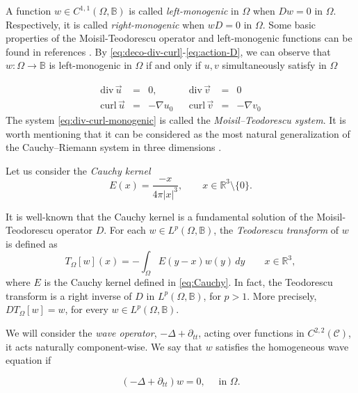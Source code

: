 \documentclass[12pt]{article}
\def\div{\mbox{div}\,}
\def\curl{\mbox{curl}\,}
\def\B{\mathbb{B}}
\begin{document}
A function $w\in C^{1,1}(\Omega,\B)$ is called \textit{left-monogenic} in $\Omega$ when $Dw=0$ in $\Omega$. Respectively, it is called \textit{right-monogenic} when $wD=0$ in $\Omega$. Some basic properties of the Moisil-Teodorescu operator and left-monogenic functions can be found in references \cite{brackx1982, kravchenko2003applied, GuHaSpr2008}. By \eqref{eq:deco-div-curl}-\eqref{eq:action-D}, we can observe that $w:\Omega\to\B$ is left-monogenic in $\Omega$ if and only if $u, v$ simultaneously satisfy in $\Omega$

\begin{equation}\label{eq:div-curl-monogenic}
    \begin{array}{rclcrcl}
        \div \vec u&=&0,& &\div\vec v&=&0\\
        \curl\vec u&=&-\nabla u_0 & & \curl\vec v&=&-\nabla v_0
    \end{array}
\end{equation}
The system \eqref{eq:div-curl-monogenic} is called the \textit{Moisil--Teodorescu system}. It is worth mentioning that it can be considered as the most natural generalization of the Cauchy--Riemann system in three dimensions \cite{kravchenko2003applied}.

Let us consider the \textit{Cauchy kernel}
\begin{equation}\label{eq:Cauchy}
    E(x)=\frac{-x}{4\pi|x|^3},\qquad x\in\mathbb{R}^3\setminus\{0\}.
\end{equation}

It is well-known that the Cauchy kernel is a fundamental solution of the Moisil-Teodorescu operator $D$. For each $w\in L^p(\Omega,\B)$, the \textit{Teodorescu transform} of $w$ is defined as
\begin{equation}\label{eq:Teodorescu}
    T_\Omega[w](x)=-\int_{\Omega} E(y-x)w(y)\, dy\qquad x\in\mathbb{R}^3,
\end{equation}
where $E$ is the Cauchy kernel defined in \eqref{eq:Cauchy}.
In fact, the Teodorescu transform is a right inverse of $D$ in $L^p(\Omega,\B)$, for $p>1$. More precisely, $DT_{\Omega}[w]=w$, for every $w\in L^p(\Omega,\B)$.

We will consider the \textit{wave operator}, $-\Delta+\partial_{tt}$, acting over functions in $C^{2,2}(\mathscr{C})$, it acts naturally component-wise. We say that $w$ satisfies the homogeneous wave equation if

\begin{equation}\label{eq:wave-equation}
    (-\Delta+\partial_{tt})w=0, \quad \text{ in }\Omega.
\end{equation}
\end{document}
